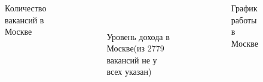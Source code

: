 \documentclass [8pt] {beamer}
\begin{document}
\begin{frame}
\begin{columns}[T]
\vskip0.6cm
\begin{figure}[H]
	\caption{Количество вакансий в Москве}
	\label{fin2}
\end{figure}
\begin{figure}[H]
	\
	\caption{Уровень дохода в Москве(из 2779 вакансий не у всех указан)}
	\label{fin1}
\end{figure}
\vskip0.4cm
\begin{figure}[H]
	\caption{График работы в Москве}
	\label{fin3}
\end{figure}
\end{columns}
\end{frame}
\end{document}
